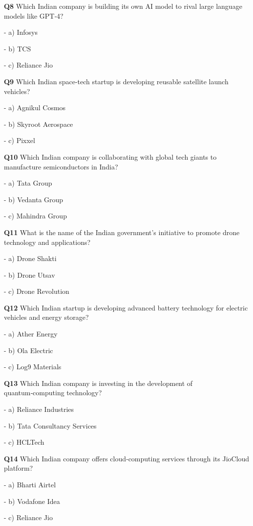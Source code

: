 \textbf{Q8} Which Indian company is building its own AI model to rival large language models like GPT‑4?\par
\quad - a) Infosys\par
\quad - b) TCS\par
\quad - c) Reliance Jio\par

\textbf{Q9} Which Indian space‑tech startup is developing reusable satellite launch vehicles?\par
\quad - a) Agnikul Cosmos\par
\quad - b) Skyroot Aerospace\par
\quad - c) Pixxel\par

\textbf{Q10} Which Indian company is collaborating with global tech giants to manufacture semiconductors in India?\par
\quad - a) Tata Group\par
\quad - b) Vedanta Group\par
\quad - c) Mahindra Group\par

\textbf{Q11} What is the name of the Indian government's initiative to promote drone technology and applications?\par
\quad - a) Drone Shakti\par
\quad - b) Drone Utsav\par
\quad - c) Drone Revolution\par

\textbf{Q12} Which Indian startup is developing advanced battery technology for electric vehicles and energy storage?\par
\quad - a) Ather Energy\par
\quad - b) Ola Electric\par
\quad - c) Log9 Materials\par

\textbf{Q13} Which Indian company is investing in the development of quantum‑computing technology?\par
\quad - a) Reliance Industries\par
\quad - b) Tata Consultancy Services\par
\quad - c) HCLTech\par

\textbf{Q14} Which Indian company offers cloud‑computing services through its JioCloud platform?\par
\quad - a) Bharti Airtel\par
\quad - b) Vodafone Idea\par
\quad - c) Reliance Jio\par

